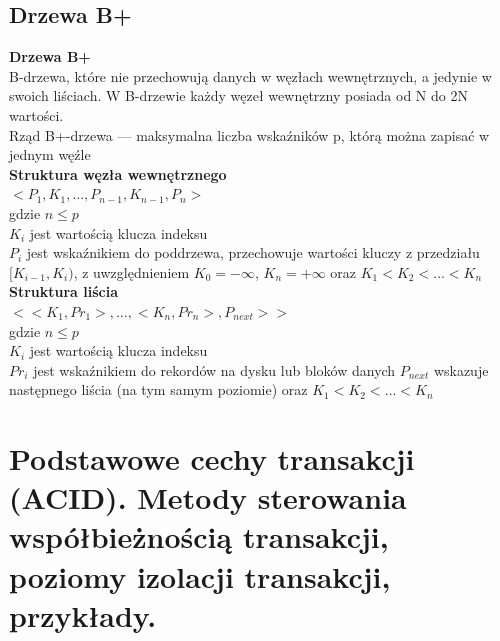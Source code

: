 \documentclass[12pt]{article}
\begin{document}
    \subsection{Drzewa B+}
    \begin{definition}
    \textbf{Drzewa B+}\\
    B-drzewa, które nie przechowują danych w węzłach
    wewnętrznych, a jedynie w swoich liściach. W B-drzewie każdy
    węzeł wewnętrzny posiada od N do 2N wartości.\\
    
    Rząd B+-drzewa — maksymalna liczba wskaźników p, którą
    można zapisać w jednym węźle\\
    
    \textbf{Struktura węzła wewnętrznego}\\
    $< P_1,K_1,\dots, P_{n - 1},K_{n - 1}, P_n >$\\
    gdzie $n \leq p$\\
    $K_i$ jest wartością klucza indeksu\\
    $P_i$ jest wskaźnikiem do poddrzewa, przechowuje wartości kluczy z
    przedziału $[K_{i - 1},K_i)$, z uwzględnieniem $K_0 = -\infty$, $K_n = +\infty$
    oraz $K_1 < K_2 < \dots < K_n$\\
    
    \textbf{Struktura liścia}\\
    $<< K_1, Pr_1 >, \dots , < K_n, Pr_n >, P_{next} >>$\\
    gdzie $n \leq p$\\
    $K_i$ jest wartością klucza indeksu\\
    $Pr_i$ jest wskaźnikiem do rekordów na dysku lub bloków danych
    $P_{next}$ wskazuje następnego liścia (na tym samym poziomie)
    oraz
    $K_1 < K_2 < \dots < K_n$
    \end{definition}
\newpage
    
    \section{Podstawowe cechy transakcji (ACID). Metody sterowania współbieżnością transakcji, poziomy izolacji transakcji, przykłady.}
    
\end{document}
